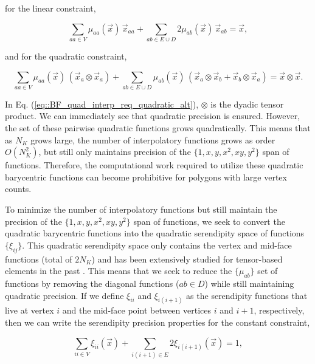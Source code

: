 \documentclass[preprint,10pt]{elsarticle}
\begin{document}
\noindent for the linear constraint,

\begin{equation}
\label{eq::BF_quad_interp_req_linear_alt}
\sum_{aa \in V}  \mu_{aa} (\vec{x}) \, \vec{x}_{aa} +  \sum_{ab \in E \cup D} 2  \mu_{ab} (\vec{x}) \, \vec{x}_{ab} = \vec{x} ,
\end{equation}

\noindent and for the quadratic constraint,

\begin{equation}
\label{eq::BF_quad_interp_req_quadratic_alt}
\sum_{aa \in V}  \mu_{aa} (\vec{x}) \, \left( \vec{x}_a \otimes \vec{x}_a \right) +  \sum_{ab \in E \cup D}   \mu_{ab} (\vec{x}) \, \left( \vec{x}_a \otimes \vec{x}_b + \vec{x}_b \otimes \vec{x}_a \right)   =  \vec{x} \otimes \vec{x} .
\end{equation}


\noindent In Eq. (\ref{eq::BF_quad_interp_req_quadratic_alt}), $\otimes$ is the dyadic tensor product. We can immediately see that quadratic precision is ensured. However, the set of these pairwise quadratic functions grows quadratically. This means that as $N_K$ grows large, the number of interpolatory functions grows as order $O(N_K^2)$, but still only maintains precision of the $\{ 1, x, y, x^2, xy, y^2 \}$ span of functions. Therefore, the computational work required to utilize these quadratic barycentric functions can become prohibitive for polygons with large vertex counts.

To minimize the number of interpolatory functions but still maintain the precision of the $\{ 1, x, y, x^2, xy, y^2 \}$ span of functions, we seek to convert the quadratic barycentric functions into the quadratic serendipity space of functions $\{ \xi_{ij} \}$. This quadratic serendipity space only contains the vertex and mid-face functions (total of $2 N_K$) and has been extensively studied for tensor-based elements in the past \cite{macneal1992eight,arnold2011serendipity}. This means that we seek to reduce the $\{ \mu_{ab} \}$ set of functions by removing the diagonal functions ($ab \in D$) while still maintaining quadratic precision. If we define $\xi_{ii}$ and $\xi_{i(i+1)}$ as the serendipity functions that live at vertex $i$ and the mid-face point between vertices $i$ and $i+1$, respectively, then we can write the serendipity precision properties for the constant constraint,

\begin{equation}
\label{eq::BF_ser_interp_req_constant}
\sum_{ii \in V}  \xi_{ii} (\vec{x}) + \sum_{i(i+1) \in E} 2 \xi_{i(i+1)} (\vec{x})  = 1 ,
\end{equation}
\end{document}
